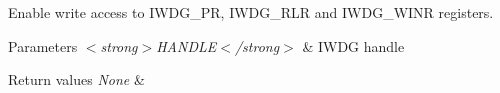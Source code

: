 Enable write access to I\+W\+D\+G\+\_\+\+PR, I\+W\+D\+G\+\_\+\+R\+LR and I\+W\+D\+G\+\_\+\+W\+I\+NR registers. 


\begin{DoxyParams}{Parameters}
{\em $<$strong$>$\+H\+A\+N\+D\+L\+E$<$/strong$>$} & I\+W\+DG handle \\
\hline
\end{DoxyParams}

\begin{DoxyRetVals}{Return values}
{\em None} & \\
\hline
\end{DoxyRetVals}
